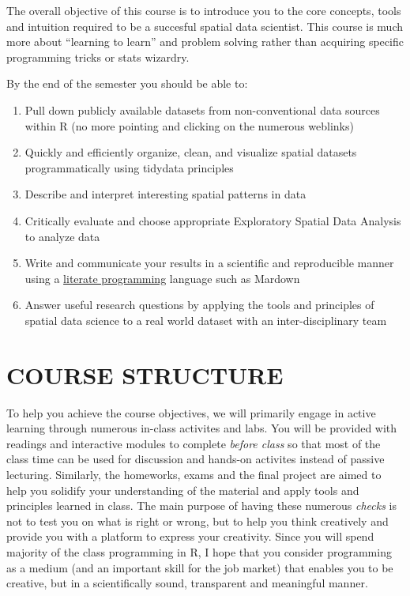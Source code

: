 \documentclass[11pt,]{article}
\begin{document}
The overall objective of this course is to introduce you to the core
concepts, tools and intuition required to be a succesful spatial data
scientist. This course is much more about ``learning to learn'' and
problem solving rather than acquiring specific programming tricks or
stats wizardry.

By the end of the semester you should be able to:

\begin{enumerate}
\def\labelenumi{\arabic{enumi}.}
\item
  Pull down publicly available datasets from non-conventional data
  sources within R (no more pointing and clicking on the numerous
  weblinks)
\item
  Quickly and efficiently organize, clean, and visualize spatial
  datasets programmatically using tidydata principles
\item
  Describe and interpret interesting spatial patterns in data
\item
  Critically evaluate and choose appropriate Exploratory Spatial Data
  Analysis to analyze data
\item
  Write and communicate your results in a scientific and reproducible
  manner using a
  \href{http://ross.net/funnelweb/tutorial/intro_what.html}{literate
  programming} language such as Mardown
\item
  Answer useful research questions by applying the tools and principles
  of spatial data science to a real world dataset with an
  inter-disciplinary team
\end{enumerate}

\hypertarget{course-structure}{%
\section{COURSE STRUCTURE}\label{course-structure}}

To help you achieve the course objectives, we will primarily engage in
active learning through numerous in-class activites and labs. You will
be provided with readings and interactive modules to complete
\emph{before class} so that most of the class time can be used for
discussion and hands-on activites instead of passive lecturing.
Similarly, the homeworks, exams and the final project are aimed to help
you solidify your understanding of the material and apply tools and
principles learned in class. The main purpose of having these numerous
\emph{checks} is not to test you on what is right or wrong, but to help
you think creatively and provide you with a platform to express your
creativity. Since you will spend majority of the class programming in R,
I hope that you consider programming as a medium (and an important skill
for the job market) that enables you to be creative, but in a
scientifically sound, transparent and meaningful manner.
\end{document}
